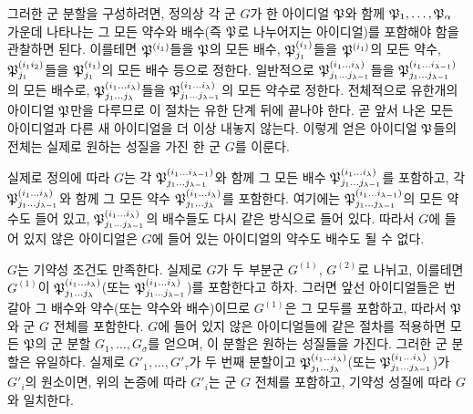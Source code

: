 그러한 군 분할을 구성하려면, 정의상 각 군 $G$가 한 아이디얼 $\mathfrak{P}$와 함께 $\mathfrak{P}_1,\ldots,\mathfrak{P}_\alpha$ 가운데 나타나는 그 모든 약수와 배수(즉 $\mathfrak{P}$로 나누어지는 아이디얼)를 포함해야 함을 관찰하면 된다. 이를테면 $\mathfrak{P}^{(i_1)}$들을 $\mathfrak{P}$의 모든 배수, $\mathfrak{P}_{j_1}^{(i_1)}$들을 $\mathfrak{P}^{(i_1)}$의 모든 약수, $\mathfrak{P}_{j_1}^{(i_1i_2)}$들을 $\mathfrak{P}_{j_1}^{(i_1)}$의 모든 배수 등으로 정한다. 일반적으로 $\mathfrak{P}_{j_1\ldots j_{\lambda-1}}^{(i_1\ldots i_\lambda)}$들을 $\mathfrak{P}_{j_1\ldots j_{\lambda-1}}^{(i_1\ldots i_{\lambda-1})}$의 모든 배수로, $\mathfrak{P}_{j_1\ldots j_\lambda}^{(i_1\ldots i_\lambda)}$들을 $\mathfrak{P}_{j_1\ldots j_{\lambda-1}}^{(i_1\ldots i_\lambda)}$의 모든 약수로 정한다. 전체적으로 유한개의 아이디얼 $\mathfrak{P}$만을 다루므로 이 절차는 유한 단계 뒤에 끝나야 한다. 곧 앞서 나온 모든 아이디얼과 다른 새 아이디얼을 더 이상 내놓지 않는다. 이렇게 얻은 아이디얼 $\mathfrak{P}$들의 전체는 실제로 원하는 성질을 가진 한 군 $G$를 이룬다.

실제로 정의에 따라 $G$는 각 $\mathfrak{P}_{j_1\ldots j_{\lambda-1}}^{(i_1\ldots i_{\lambda-1})}$와 함께 그 모든 배수 $\mathfrak{P}_{j_1\ldots j_{\lambda-1}}^{(i_1\ldots i_\lambda)}$를 포함하고, 각 $\mathfrak{P}_{j_1\ldots j_{\lambda-1}}^{(i_1\ldots i_\lambda)}$와 함께 그 모든 약수 $\mathfrak{P}_{j_1\ldots j_\lambda}^{(i_1\ldots i_\lambda)}$를 포함한다. 여기에는 $\mathfrak{P}_{j_1\ldots j_{\lambda-1}}^{(i_1\ldots i_{\lambda-1})}$의 모든 약수도 들어 있고, $\mathfrak{P}_{j_1\ldots j_{\lambda-1}}^{(i_1\ldots i_\lambda)}$의 배수들도 다시 같은 방식으로 들어 있다. 따라서 $G$에 들어 있지 않은 아이디얼은 $G$에 들어 있는 아이디얼의 약수도 배수도 될 수 없다.

$G$는 기약성 조건도 만족한다. 실제로 $G$가 두 부분군 $G^{(1)}$, $G^{(2)}$로 나뉘고, 이를테면 $G^{(1)}$이 $\mathfrak{P}_{j_1\ldots j_\lambda}^{(i_1\ldots i_\lambda)}$(또는 $\mathfrak{P}_{j_1\ldots j_{\lambda-1}}^{(i_1\ldots i_\lambda)}$)를 포함한다고 하자. 그러면 앞선 아이디얼들은 번갈아 그 배수와 약수(또는 약수와 배수)이므로 $G^{(1)}$은 그 모두를 포함하고, 따라서 $\mathfrak{P}$와 군 $G$ 전체를 포함한다. $G$에 들어 있지 않은 아이디얼들에 같은 절차를 적용하면 모든 $\mathfrak{P}$의 군 분할 $G_1,\ldots,G_\sigma$를 얻으며, 이 분할은 원하는 성질들을 가진다. 그러한 군 분할은 유일하다. 실제로 $G'_1,\ldots,G'_\tau$가 두 번째 분할이고 $\mathfrak{P}_{j_1\ldots j_\lambda}^{(i_1\ldots i_\lambda)}$(또는 $\mathfrak{P}_{j_1\ldots j_{\lambda-1}}^{(i_1\ldots i_\lambda)}$)가 $G'_i$의 원소이면, 위의 논증에 따라 $G'_i$는 군 $G$ 전체를 포함하고, 기약성 성질에 따라 $G$와 일치한다.

